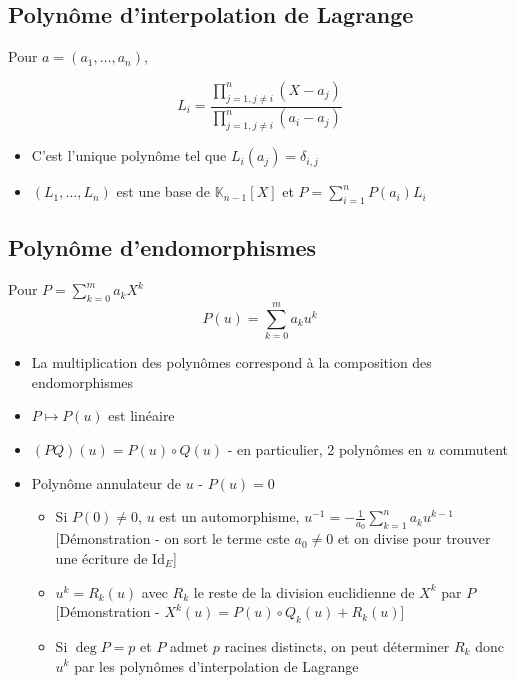\documentclass[openany]{book}
\begin{document}
\subsection{Polynôme d'interpolation de Lagrange}
Pour $a = (a_1, \dots , a_n)$,

\[ L_i = \frac{\prod_{j=1, j\neq i}^{n} (X-a_j)}{\prod_{j=1, j\neq i}^{n} (a_i-a_j)} \]

\begin{itemize}
    \item C'est l'unique polynôme tel que $L_i(a_j) = \delta_{i, j}$
    \item $(L_1, \dots, L_n)$ est une base de $\mathbb{K}_{n-1}[X]$ et $P = \sum_{i=1}^{n} P(a_i)L_i$
\end{itemize}

\subsection{Polynôme d'endomorphismes}
Pour $P = \sum_{k=0}^{m} a_k X^k $
\[ P(u) = \sum_{k=0}^{m} a_k u^k \]

\begin{itemize}
    \item La multiplication des polynômes correspond à la composition des endomorphismes
    \item $P \mapsto P(u)$ est linéaire
    \item $(PQ)(u) = P(u) \circ Q(u)$ - en particulier, 2 polynômes en $u$ commutent
    \item Polynôme annulateur de $u$ - $P(u) = 0$
    \begin{itemize}
        \item Si $P(0) \neq 0$, $u$ est un automorphisme, $u^{-1} = - \frac{1}{a_0} \sum_{k=1}^{n} a_k u^{k-1}$ [Démonstration - on sort le terme cste $a_0 \neq 0$ et on divise pour trouver une écriture de $\text{Id}_E$]
        \item $u^k = R_k(u)$ avec $R_k$ le reste de la division euclidienne de $X^k$ par $P$ [Démonstration - $X^k(u) = P(u)\circ Q_k(u) + R_k(u)$]
        \item Si $\deg P = p$ et $P$ admet $p$ racines distincts, on peut déterminer $R_k$ donc $u^k$ par les polynômes d'interpolation de Lagrange
    \end{itemize}
\end{itemize}

\clearpage
\end{document}
